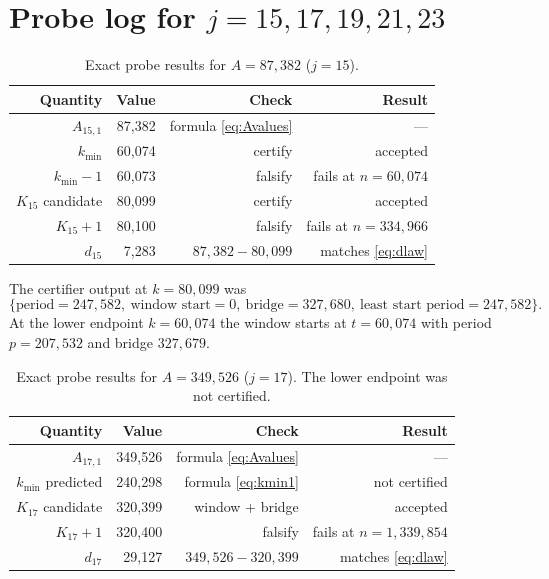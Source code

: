 \documentclass[11pt]{article}
\theoremstyle{remark}
\begin{document}
\section{Probe log for \(j=15,17,19,21,23\)}

\begin{table}[h]
\centering
\small
\caption{Exact probe results for \(A=87{,}382\) (\(j=15\)).}
\begin{tabular}{rrrr}
\toprule
Quantity & Value & Check & Result\\
\midrule
\(A_{15,1}\) & 87{,}382 & formula \eqref{eq:Avalues} & ---\\
\(k_{\min}\) & 60{,}074 & certify & accepted\\
\(k_{\min}-1\) & 60{,}073 & falsify & fails at \(n=60{,}074\)\\
\(K_{15}\) candidate & 80{,}099 & certify & accepted\\
\(K_{15}+1\) & 80{,}100 & falsify & fails at \(n=334{,}966\)\\
\(d_{15}\) & 7{,}283 & \(87{,}382-80{,}099\) & matches \eqref{eq:dlaw}\\
\bottomrule
\end{tabular}
\end{table}

The certifier output at \(k=80{,}099\) was
\[
\{\text{period}=247{,}582,\ \text{window start}=0,\ \text{bridge}=327{,}680,\ \text{least start period}=247{,}582\}.
\]
At the lower endpoint \(k=60{,}074\) the window starts at \(t=60{,}074\) with
period \(p=207{,}532\) and bridge \(327{,}679\).

\begin{table}[h]
\centering
\small
\caption{Exact probe results for \(A=349{,}526\) (\(j=17\)). The lower endpoint was not certified.}
\begin{tabular}{rrrr}
\toprule
Quantity & Value & Check & Result\\
\midrule
\(A_{17,1}\) & 349{,}526 & formula \eqref{eq:Avalues} & ---\\
\(k_{\min}\) predicted & 240{,}298 & formula \eqref{eq:kmin1} & not certified\\
\(K_{17}\) candidate & 320{,}399 & window + bridge & accepted\\
\(K_{17}+1\) & 320{,}400 & falsify & fails at \(n=1{,}339{,}854\)\\
\(d_{17}\) & 29{,}127 & \(349{,}526-320{,}399\) & matches \eqref{eq:dlaw}\\
\bottomrule
\end{tabular}
\end{table}
\end{document}
